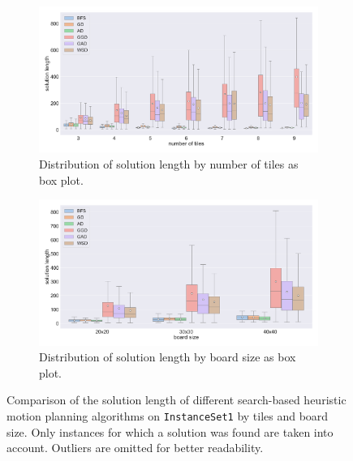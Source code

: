 \begin{figure}[H]
\begin{subfigure}[b]{\textwidth}
\centering
\includegraphics[width=\textwidth]{figures/plots/heuristic_solvers_i1/hs_i1_solution_length_over_tiles.pdf}
\caption{Distribution of solution length by number of tiles as box plot.}
\label{fig:hs_i1_solution_length_over_tiles}
\end{subfigure}
\begin{subfigure}[b]{\textwidth}
\centering
\includegraphics[width=\textwidth]{figures/plots/heuristic_solvers_i1/hs_i1_solution_length_over_board_size.pdf}
\caption{Distribution of solution length by board size as box plot.}
\label{fig:hs_i1_solution_length_over_board_size}
\end{subfigure}
\caption[Solution lengths for search-based heuristic planners on \texttt{InstanceSet1}]{Comparison of the solution length of different search-based heuristic motion planning algorithms on \texttt{InstanceSet1} by tiles and board size. Only instances for which a solution was found are taken into account. Outliers are omitted for better readability.}
\label{fig:hs_i1_performance3}
\end{figure}

